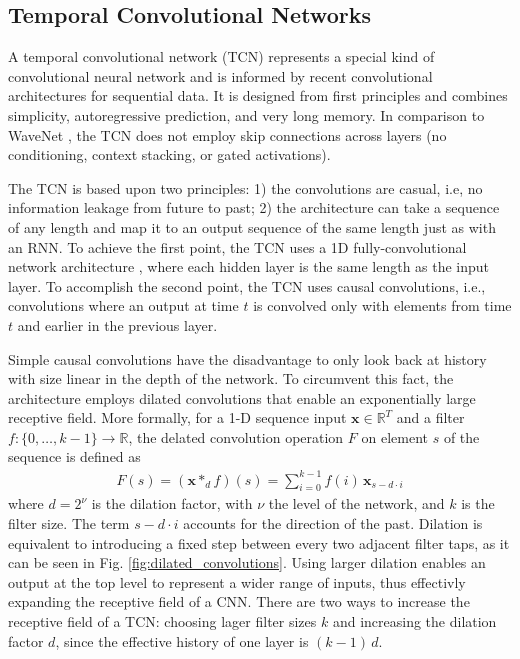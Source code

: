 \documentclass{scrartcl}
\begin{document}






\subsection{Temporal Convolutional Networks}

A temporal convolutional network (TCN) \cite{Bai2018} represents a special kind of convolutional neural network and is informed by recent convolutional architectures for sequential data. It is designed from first principles and combines simplicity, autoregressive prediction, and very long memory. In comparison to WaveNet \cite{Oord2016}, the TCN does not employ skip connections across layers (no conditioning, context stacking, or gated activations).

The TCN is based upon two principles: 1) the convolutions are casual, i.e, no information leakage from future to past; 2) the architecture can take a sequence of any length and map it to an output sequence of the same length just as with an RNN. To achieve the first point, the TCN uses a 1D fully-convolutional network architecture \cite{Long2015}, where each hidden layer is the same length as the input layer. To accomplish the second point, the TCN uses causal convolutions, i.e., convolutions where an output at time $t$ is convolved only with elements from time $t$ and earlier in the previous layer.

Simple causal convolutions have the disadvantage to only look back at history with size linear in the depth of the network. To circumvent this fact, the architecture employs dilated convolutions that enable an exponentially large receptive field. More formally, for a 1-D sequence input $\mathbf x \in \mathbb R^T$ and a filter $f:\{ 0, \dots, k-1\} \rightarrow \mathbb R$, the delated convolution operation $F$ on element $s$ of the sequence is defined as
\begin{align}
F(s) = (\mathbf x *_d f)(s) = \sum_{i=0}^{k-1} f(i) \, \mathbf x_{s-d\cdot i}
\end{align}
where $d = 2^\nu$ is the dilation factor, with $\nu$ the level of the network, and $k$ is the filter size. The term $s-d\cdot i$ accounts for the direction of the past. Dilation is equivalent to introducing a fixed  step between every two adjacent filter taps, as it can be seen in Fig. \ref{fig:dilated_convolutions}. Using larger dilation enables an output at the top level to represent a wider range of inputs, thus effectivly expanding the receptive field of a CNN. There are two ways to increase the receptive field of a TCN: choosing lager filter sizes $k$ and increasing the dilation factor $d$, since the effective history of one layer is $(k-1) \, d$. 
\end{document}
